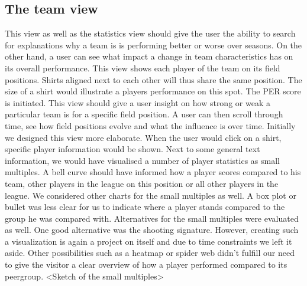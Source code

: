 \documentclass{sigchi}
\begin{document}
\subsection{The team view}
This view as well as the statistics view should give the user the ability to search
for explanations why a team is is performing better or worse over seasons. On the 
other hand, a user can see what impact a change in team characteristics has on its
overall performance.
This view shows each player of the team on its field positions. Shirts aligned next to 
each other will thus share the same position. The size of a shirt would illustrate a players performance on this spot. The PER score is initiated. This view should give
a user insight on how strong or weak a particular team is for a specific field position.
A user can then scroll through time, see how field positions evolve and what the influence
is over time.
Initially we designed this view more elaborate. When the user would click on a shirt,
specific player information would be shown. Next to some general text information, 
we would have visualised a number of player statistics as small multiples. A bell curve
should have informed how a player scores compared to his team, other players in the 
league on this position or all other players in the league. We considered other charts for
the small multiples as well. A box plot or bullet was less clear for us to indicate where
a player stands compared to the group he was compared with. Alternatives for the small 
multiples were evaluated as well. One good alternative was the shooting signature.\cite{peterbeshai}
However, creating such a visualization is again a project on itself and due to time 
constraints we left it aside. Other possibilities such as a heatmap or spider web didn't
fulfill our need to give the visitor a clear overview of how a player performed compared
to its peergroup.
<Sketch of the small multiples>
\end{document}
